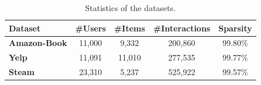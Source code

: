 \documentclass[sigconf]{acmart}
\begin{document}
\begin{table}[t]
\small
\setlength{\abovecaptionskip}{0.1cm}
\setlength{\belowcaptionskip}{0.1cm} 
  \caption{ Statistics of the datasets.}
  \label{dataset}
  \begin{tabular}{l|c|c|c|c}
    \hline
    \textbf{Dataset}&\textbf{\#Users}&\textbf{\#Items}&\textbf{\#Interactions}&\textbf{Sparsity}\\
    \hline
    \hline
    \textbf{Amazon-Book}&11,000&9,332&200,860&99.80\%\\
    \textbf{Yelp}&11,091&11,010&277,535&99.77\%\\
    \textbf{Steam}&23,310&5,237&525,922&99.57\%\\
    \hline
  \end{tabular}
\end{table}
\end{document}
